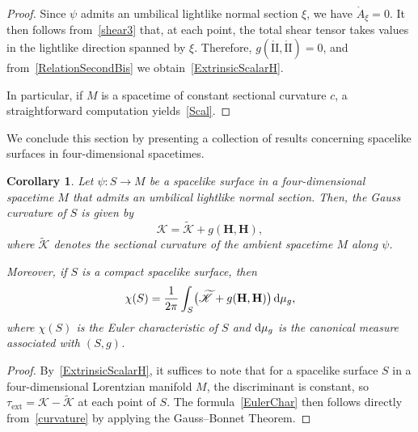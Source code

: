 \documentclass[11pt]{article}
\numberwithin{equation}{section}
\newtheorem{corollary}[theorem]{Corollary}
\begin{document}
\begin{proof}
	Since $\psi$ admits an umbilical lightlike normal section $\xi$, we have $\mathring{A}_\xi = 0$. It then follows from~\eqref{shear3} that, at each point, the total shear tensor takes values in the lightlike direction spanned by $\xi$. Therefore, $g(\mathring{\mathrm{II}}, \mathring{\mathrm{II}}) = 0$, and from~\eqref{RelationSecondBis} we obtain~\eqref{ExtrinsicScalarH}.
	
	In particular, if $M$ is a spacetime of constant sectional curvature $c$, a straightforward computation yields~\eqref{Scal}.
\end{proof}
	
	We conclude this section by presenting a collection of results concerning spacelike surfaces in four-dimensional spacetimes.
	
	\begin{corollary}\label{GaussCurvature}
		Let $\psi \colon S \to M$ be a spacelike surface in a four-dimensional spacetime $M$ that admits an umbilical lightlike normal section. Then, the Gauss curvature of $S$ is given by
		\begin{equation} \label{curvature}
			\mathscr{K} = \widetilde{\mathscr{K}} + g(\mathbf{H}, \mathbf{H}),
		\end{equation}
		where $\widetilde{\mathscr{K}}$ denotes the sectional curvature of the ambient spacetime $M$ along $\psi$.
		
		Moreover, if $S$ is a compact spacelike surface, then 
		\begin{equation}\label{EulerChar}
			\chi(S) = \frac{1}{2\pi} \int_S \bigl( \widetilde{\mathscr{K}}+g(\mathbf{H}, \mathbf{H})  \bigr) \, {\rm d} \mu_g,
		\end{equation}
		where $\chi(S)$ is the Euler characteristic of $S$ and ${\rm d} \mu_g$ is the canonical measure associated with $(S,g)$.
	\end{corollary}
\begin{proof}
	By~\eqref{ExtrinsicScalarH}, it suffices to note that for a spacelike surface $S$ in a four-dimensional Lorentzian manifold $M$, the discriminant is constant, so $\tau_{\mathrm{ext}} = \mathscr{K} - \widetilde{\mathscr{K}}$ at each point of $S$. The formula~\eqref{EulerChar} then follows directly from~\eqref{curvature} by applying the Gauss--Bonnet Theorem.
\end{proof}
	
\end{document}

